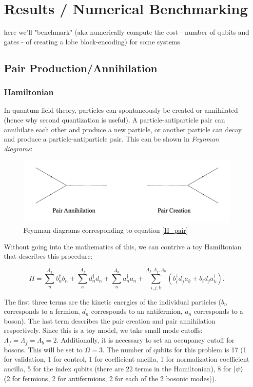\section{Results / Numerical Benchmarking}
\label{sec:results}

here we'll "benchmark" (aka numerically compute the cost - number of qubits and gates - of creating a lobe block-encoding) for some systems

%
%
%

\subsection{Pair Production/Annihilation}
\subsubsection{Hamiltonian}
In quantum field theory, particles can spontaneously be created or annihilated (hence why second quantization is useful). A particle-antiparticle pair can annihilate each other and produce a new particle, or another particle can decay and produce a particle-antiparticle pair. This can be shown in \emph{Feynman diagrams}:

\begin{figure}[h]
    \includegraphics[width = 0.7\linewidth]{figures/creation_annihilate.png}
    \caption{Feynman diagrams corresponding to equation \ref{H_pair}}
\end{figure}


Without going into the mathematics of this, we can contrive a toy Hamiltonian that describes this procedure:

\begin{equation}
    \label{H_pair}
    H = \sum_n^{\Lambda_{f}} b_n^\dagger b_n + \sum_n^{\Lambda_{\bar{f}}} d_n^\dagger d_n + \sum_n^{\Lambda_{b}} a_n^\dagger a_n + \sum_{i,j,k}^{\Lambda_f, \Lambda_{\bar{f}}, \Lambda_b} \left(b_i^\dagger d_j^\dagger a_k + b_i d_j a_k^\dagger \right).
\end{equation}

The first three terms are the kinetic energies of the individual particles ($b_n$ corresponds to a fermion, $d_n$ corresponds to an antifermion, $a_n$ corresponds to a boson). The last term describes the pair creation and pair annihilation respectively. 
Since this is a toy model, we take small mode cutoffs: $\Lambda_f = \Lambda_{\bar{f}} = \Lambda_b = 2$. Additionally, it is necessary to set an occupancy cutoff for bosons. This will be set to $\Omega = 3$. The number of qubits for this problem is 17 (1 for validation, 1 for control, 1 for coefficient ancilla, 1 for normalization coefficient ancilla, 5 for the index qubits (there are 22 terms in the Hamiltonian), 8 for $\ket{\psi}$ (2 for fermions, 2 for antifermions, 2 for each of the 2 bosonic modes)).

